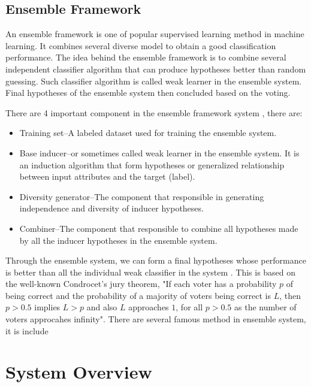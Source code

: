 \documentclass{article}
\begin{document}
\subsection{Ensemble Framework}
\label{ensemble}

An ensemble framework is one of popular supervised learning method in machine learning. It combines several diverse model to obtain a good classification performance. The idea behind the ensemble framework is to combine several independent classifier algorithm that can produce hypotheses better than random guessing. Such classifier algorithm is called weak learner in the ensemble system. Final hypotheses of the ensemble system then concluded based on the voting.

There are 4 important component in the ensemble framework system \cite{Rokach2010}, there are:

\begin{itemize}
\item Training set--A labeled dataset used for training the ensemble system.
\item Base inducer--or sometimes called weak learner in the ensemble system. It is an induction algorithm that form hypotheses or generalized relationship between input attributes and the target (label).
\item Diversity generator--The component that responsible in generating independence and diversity of inducer hypotheses.
\item Combiner--The component that responsible to combine all hypotheses made by all the inducer hypotheses in the ensemble system.
\end{itemize}

Through the ensemble system, we can form a final hypotheses whose performance is better than all the individual weak classifier in the system \cite{Rokach2010}. This is based on the well-known Condrocet's jury theorem, "If each voter has a probability $p$ of being correct and the probability of a majority of voters being correct is $L$, then $p > 0.5$ implies $L > p$ and also $L$ approaches $1$, for all $p > 0.5$ as the number of voters approcahes infinity". There are several famous method in ensemble system, it is include



\section{System Overview}
\label{overview}
\end{document}
